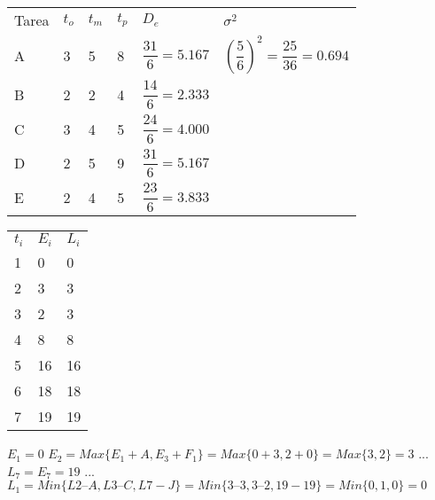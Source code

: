 \begin{table}[]
\begin{tabular}{llllll}
Tarea & $t_o$ & $t_m$ & $t_p$ & $D_e$ & $\sigma^{2}$ \\
A     & 3    & 5    & 8    &  $\dfrac{31}{6} = 5.167 $  &  $\left( \dfrac{5}{6} \right) ^{2} = \dfrac{25}{36} = 0.694$ \\
B     & 2    & 2    & 4    &  $\dfrac{14}{6} = 2.333 $  &     \\
C     & 3    & 4    & 5    &  $\dfrac{24}{6} = 4.000 $  &     \\
D     & 2    & 5    & 9    &  $\dfrac{31}{6} = 5.167 $  &     \\
E     & 2    & 4    & 5    &  $\dfrac{23}{6} = 3.833 $  &    
\end{tabular}
\end{table}




\begin{table}[]
\begin{tabular}{lll}
$t_i$ & $E_i$ & $L_i$ \\
1 & 0 & 0 \\
2 & 3 & 3 \\
3 & 2 & 3 \\
4 & 8 & 8 \\
5 & 16 & 16 \\
6 & 18 & 18 \\
7 & 19 & 19 \\                                  
\end{tabular}
\end{table}

$E_1 = 0$
$E_2 = Max \{E_1 + A, E_3 + F_1\} = Max \{0 + 3, 2 + 0\} = Max \{3, 2\} = 3$
...
$L_7 = E_7 = 19$
...
$L_1 = Min \{L2 – A, L3 – C, L7 - J\} = Min \{3 – 3, 3 – 2, 19 - 19\} = Min \{0, 1, 0\} = 0$
                                 
								 
						
